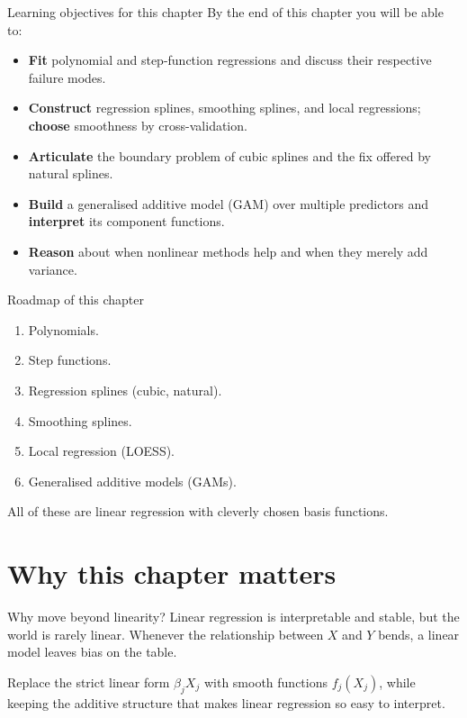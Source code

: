 \documentclass[aspectratio=169,11pt]{beamer}
\begin{document}
\begin{frame}{Learning objectives for this chapter}
  By the end of this chapter you will be able to:
  \begin{itemize}
    \item \textbf{Fit} polynomial and step-function regressions and
          discuss their respective failure modes.
    \item \textbf{Construct} regression splines, smoothing splines, and
          local regressions; \textbf{choose} smoothness by
          cross-validation.
    \item \textbf{Articulate} the boundary problem of cubic splines
          and the fix offered by natural splines.
    \item \textbf{Build} a generalised additive model (GAM) over
          multiple predictors and \textbf{interpret} its component
          functions.
    \item \textbf{Reason} about when nonlinear methods help and when
          they merely add variance.
  \end{itemize}
\end{frame}


\begin{frame}{Roadmap of this chapter}
  \begin{takeaway}
    \begin{enumerate}
      \item Polynomials.
      \item Step functions.
      \item Regression splines (cubic, natural).
      \item Smoothing splines.
      \item Local regression (LOESS).
      \item Generalised additive models (GAMs).
    \end{enumerate}
  \end{takeaway}
  All of these are linear regression with cleverly chosen basis
  functions.
\end{frame}

\section{Why this chapter matters}

\begin{frame}{Why move beyond linearity?}
  Linear regression is interpretable and stable, but the world is
  rarely linear. Whenever the relationship between $X$ and $Y$ bends,
  a linear model leaves bias on the table.
  \begin{takeaway}
    Replace the strict linear form $\beta_j X_j$ with smooth functions
    $f_j(X_j)$, while keeping the additive structure that makes linear
    regression so easy to interpret.
  \end{takeaway}
\end{frame}
\end{document}
